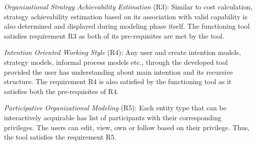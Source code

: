 \textit{Organizational Strategy Achievability Estimation} (R3): Similar to cost calculation, strategy achievability estimation based on its association with valid capability is also determined and displayed during modeling phase itself. The functioning tool satisfies requirement R3 as both of its pre-requisites are met by the tool.

\textit{Intention Oriented Working Style} (R4): Any user and create intention models, strategy models, informal process models etc., through the developed tool provided the user has understanding about main intention and its recursive structure. The requirement R4 is also satisfied by the functioning tool as it satisfies both the pre-requisites of R4.

\textit{Participative Organizational Modeling} (R5): Each entity type that can be interactively acquirable has list of participants with their corresponding privileges. The users can edit, view, own or follow based on their privilege. Thus, the tool satisfies the requirement R5.

